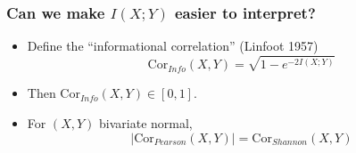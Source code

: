 \documentclass{beamer}
\begin{document}

\begin{frame}
\frametitle{Can we make $I(X; Y)$ easier to interpret?}
\begin{itemize}
\item Define the ``informational correlation'' (Linfoot 1957)
\[
\text{Cor}_{Info}(X, Y) = \sqrt{1-e^{-2I(X; Y)}}
\]\pause
\item Then $\text{Cor}_{Info}(X, Y) \in [0,1]$.
\item For $(X, Y)$ bivariate normal,
\[
|\text{Cor}_{Pearson}(X, Y)| = \text{Cor}_{Shannon}(X, Y)
\]
\end{itemize}
\pause 
\end{frame}
\end{document}
